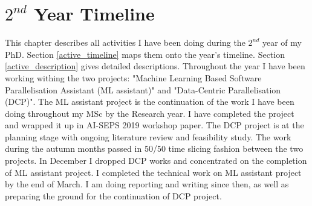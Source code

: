 \documentclass[10pt,a4paper]{report}
\begin{document}
\chapter{$2^{nd}$ Year Timeline}
\quad This chapter describes all activities I have been doing during the $2^{nd}$ year of my PhD. Section \ref{active_timeline} maps them onto the year's timeline. Section \ref{active_description} gives detailed descriptions. Throughout the year I have been working withing the two projects: "Machine Learning Based Software Parallelisation Assistant (ML assistant)" and "Data-Centric Parallelisation (DCP)". The ML assistant project is the continuation of the work I have been doing throughout my MSc by the Research year. I have completed the project and wrapped it up in AI-SEPS 2019 workshop paper. The DCP project is at the planning stage with ongoing literature review and feasibility study. The work during the autumn months passed in 50/50 time slicing fashion between the two projects. In December I dropped DCP works and concentrated on the completion of ML assistant project. I completed the technical work on ML assistant project by the end of March. I am doing reporting and writing since then, as well as preparing the ground for the continuation of DCP project.
   
\end{document}
